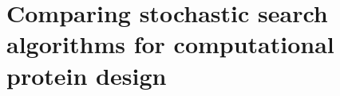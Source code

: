 \chapter{Comparing stochastic search algorithms for computational protein design}
\label{chap:Comparaison}


\clearpage
\pagebreak




